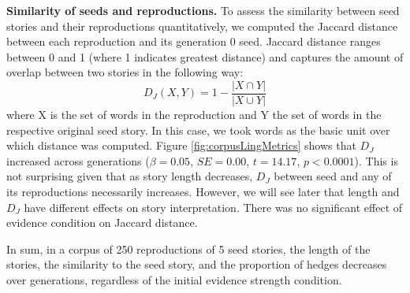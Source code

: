 \documentclass[10pt,letterpaper]{article}
\newcommand{\ek}[1]{\textcolor{Orange}{[ek: #1]}}
\newcommand{\mf}[1]{\textcolor{PinkyPurple}{[mf: #1]}}
\begin{document}
\textbf{Similarity of seeds and reproductions.} %
To assess the similarity between seed stories and their reproductions quantitatively, we computed the Jaccard distance between each reproduction and its generation 0 seed. Jaccard distance ranges between 0 and 1 (where 1 indicates greatest distance) and captures the amount of overlap between two stories in the following way: \[D_J(X,Y) = 1 - \frac{|X \cap Y|}{|X \cup Y|}\] where X is the set of words in the reproduction and Y the set of words in the respective original seed story. In this case, we took words as the basic unit over which distance was computed. Figure \ref{fig:corpusLingMetrics} shows that $D_J$ increased across generations ($\beta = 0.05$, $SE = 0.00$, $t = 14.17$, $p < 0.0001$). This is not surprising given that as story length decreases, $D_J$ between seed and any of its reproductions necessarily increases. However, we will see later that length and $D_J$ have different effects on story interpretation. There was no significant effect of evidence condition on Jaccard distance. %


In sum, in a corpus of 250 reproductions of 5 seed stories, the length of the stories, the similarity to the seed story, and the proportion of hedges decreases over generations, regardless of the initial evidence strength condition.
\end{document}
